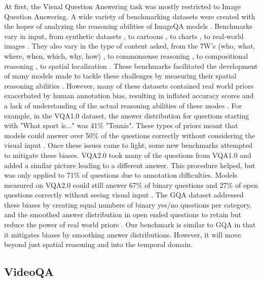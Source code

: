 \documentclass[10pt,twocolumn,letterpaper]{article}
\begin{document}
At first, the Visual Question Answering task was mostly restricted to Image Question Answering. A wide variety of benchmarking datasets were created with the hopes of analyzing the reasoning abilities of ImageQA models \cite{johnson2017clevr, hudson2019gqa, antol2015vqa, zellers2019recognition, goyal2017making, krishna2017visual, zhu2016visual7w, kim2020answering}. Benchmarks vary in input, from synthetic datasets \cite{johnson2017clevr}, to cartoons \cite{antol2015vqa}, to charts \cite{kim2017deepstory}, to real-world images \cite{hudson2019gqa, krishna2017visual, zhu2016visual7w, goyal2017making, zellers2019recognition, antol2015vqa}. They also vary in the type of content asked, from the 7W's (who, what, where, when, which, why, how) \cite{zhu2016visual7w}, to commonsense reasoning \cite{zellers2019recognition}, to compositional reasoning \cite{johnson2017clevr, hudson2019gqa}, to spatial localization \cite{zhu2016visual7w, krishna2017visual, hudson2019gqa}. These benchmarks facilitated the development of many models made to tackle these challenges by measuring their spatial reasoning abilities \cite{}. However, many of these datasets contained real world priors exacerbated by human annotation bias, resulting in inflated accuracy scores and a lack of understanding of the actual reasoning abilities of these modes \cite{goyal2017making, hudson2019gqa}. For example, in the VQA1.0 dataset, the answer distribution for questions starting with "What sport is..." was 41\% "Tennis". These types of priors meant that models could answer over 50\% of the questions correctly without considering the visual input \cite{goyal2017making}. Once these issues came to light, some new benchmarks attempted to mitigate these biases. VQA2.0 took many of the questions from VQA1.0 and added a similar picture leading to a different answer. This procedure helped, but was only applied to 71\% of questions due to annotation difficulties. Models measured on VQA2.0 could still answer 67\% of binary questions and 27\% of open questions correctly without seeing visual input \cite{hudson2019gqa}. The GQA dataset addressed these biases by creating equal numbers of binary yes/no questions per category, and the smoothed answer distribution in open ended questions to retain but reduce the power of real world priors \cite{hudson2019gqa}. Our benchmark is similar to GQA in that it mitigates biases by smoothing answer distributions. However, it will move beyond just spatial reasoning and into the temporal domain. 

\subsection{VideoQA}
\end{document}
